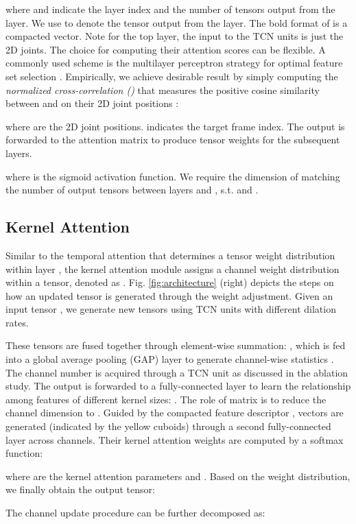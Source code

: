 \documentclass[twocolumn]{svjour3}          \smartqed  \usepackage{graphicx}
\begin{document}
where  and  indicate the layer index and the number of tensors output from the  layer. We use  to denote the  tensor output from the  layer. The bold format of  is a compacted vector. Note for the top layer, the input to the TCN units is just the 2D joints. The choice for computing their attention scores can be flexible. A commonly used scheme is the {multilayer perceptron} strategy for optimal feature set selection \citep{Ruck1990}. Empirically, we achieve desirable result by simply computing the \emph{normalized cross-correlation ()} that measures the positive cosine similarity between  and  on their 2D joint positions  \citep{Yoo2009}: 

where   are the 2D joint positions.  indicates the target frame index.
The output  is forwarded to the attention matrix  to produce tensor weights for the subsequent layers.


where  is the sigmoid activation function. We require the dimension of  matching the number of output tensors between layers  and , s.t.  and . 


\subsection{Kernel Attention}
Similar to the temporal attention that determines a tensor weight distribution  within layer , the kernel attention module assigns a channel weight distribution within a tensor, denoted as . Fig. \ref{fig:architecture} (right) depicts the steps on how an updated tensor  is generated through the weight adjustment. Given an input tensor , we generate  new tensors  using  TCN units with different dilation rates. 

These  tensors are fused together through element-wise summation: , which is fed into a global average pooling (GAP) layer to generate channel-wise statistics . The channel number  is acquired through a TCN unit as discussed in the ablation study. The output  is forwarded to a fully-connected layer to learn the relationship among features of different kernel sizes: . The role of matrix  is to reduce the channel dimension to . Guided by the compacted feature descriptor ,  vectors are generated (indicated by the yellow cuboids) through a second fully-connected layer across channels. Their kernel attention weights are computed by a softmax function:


where  are the kernel attention parameters and . Based on the weight distribution, we finally obtain the output tensor: 

The channel update procedure can be further decomposed as:
\end{document}
